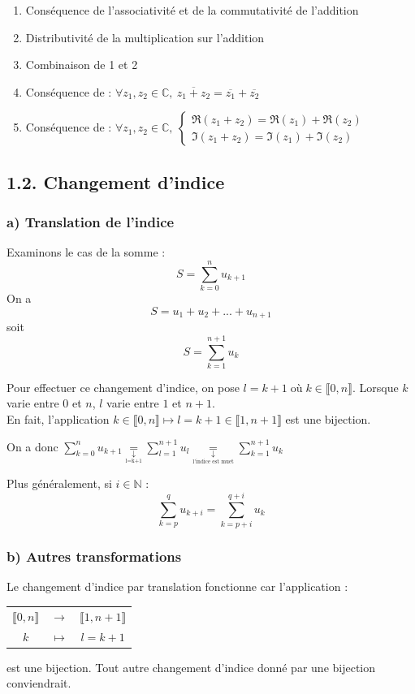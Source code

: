 \documentclass[a4paper,11pt]{article}
\newcommand{\N}{\mathbb{N}}
\newcommand{\C}{\mathbb{C}}
\newcommand{\intN}[2]{\llbracket #1, #2 \rrbracket}
\newcommand{\equalwithtext}[1]{\underset{\underset{\text{#1}}{\downarrow}}{=}}
\begin{document}
\begin{remarque}
	\begin{enumerate}
		\item Conséquence de l'associativité et de la commutativité de l'addition
		\item Distributivité de la multiplication sur l'addition
		\item Combinaison de 1 et 2
		\item Conséquence de : $\forall z_1, z_2 \in\C, \: \overline{z_1 + z_2} = \overline{z_1} + \overline{z_2}$
		\item Conséquence de : $\forall z_1, z_2 \in\C, \:
		\begin{cases}
			\Re(z_1 + z_2) = \Re(z_1) + \Re(z_2)\\
			\Im(z_1 + z_2) = \Im(z_1) + \Im(z_2)
		\end{cases}$
	\end{enumerate}
\end{remarque}

\subsection*{1.2. Changement d'indice}

\subsubsection*{a) Translation de l'indice}

Examinons le cas de la somme : $$S = \sum_{k=0}^{n}u_{k+1}$$
On a $$S = u_1 + u_2 + ... + u_{n+1}$$
soit $$S = \sum_{k=1}^{n+1}u_k$$

Pour effectuer ce changement d'indice, on pose $l = k + 1 \; \text{où} \; k \in \intN{0}{n}$. Lorsque $k$ varie entre $0$ et $n$, $l$ varie entre $1$ et $n+1$.\\
En fait, l'application $k\in\intN{0}{n} \longmapsto l = k+1 \in \intN{1}{n+1}$ est une bijection.

On a donc $\sum_{k=0}^{n}u_{k+1} \equalwithtext{l=k+1} \sum_{l=1}^{n+1}u_l \equalwithtext{l'indice est muet} \sum_{k=1}^{n+1}u_k$

Plus généralement, si $i\in\N$ : $$\sum_{k=p}^{q}u_{k+i} = \sum_{k=p+i}^{q+i}u_k$$

\subsubsection*{b) Autres transformations}

Le changement d'indice par translation fonctionne car l'application :
\begin{tabular}{ccc}
	$\intN{0}{n}$ & $\longrightarrow$ & $\intN{1}{n+1}$ \\
	$k$ & $\longmapsto$ & $l = k + 1$
\end{tabular}
est une bijection. Tout autre changement d'indice donné par une bijection conviendrait.
\end{document}
